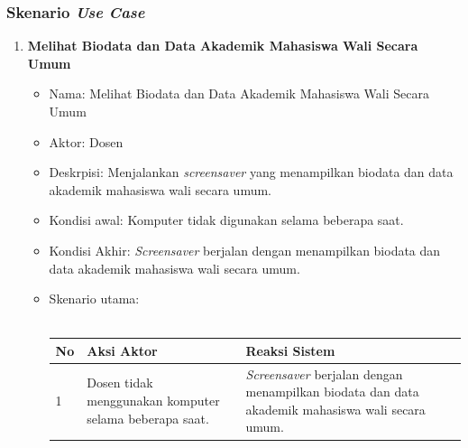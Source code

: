 \subsubsection{Skenario \textit{Use Case}}
\begin{enumerate}
	\item \textbf{Melihat Biodata dan Data Akademik Mahasiswa Wali Secara Umum}
	\begin{itemize}
		\item Nama: Melihat Biodata dan Data Akademik Mahasiswa Wali Secara Umum
		\item Aktor: Dosen 
		\item Deskrpisi: Menjalankan \textit{screensaver} yang menampilkan biodata dan data akademik mahasiswa wali secara umum.
		\item Kondisi awal: Komputer tidak digunakan selama beberapa saat.
		\item Kondisi Akhir: \textit{Screensaver} berjalan dengan menampilkan biodata dan data akademik mahasiswa wali secara umum.
		\item Skenario utama: \\ \\
			\begin{tabular}{|p{0.5cm} |p{6cm}| p{6cm}|}
				\hline
				No 	& Aksi Aktor & Reaksi Sistem \\ \hline
				1 	& Dosen tidak menggunakan komputer selama beberapa saat. 	&	\textit{Screensaver} berjalan dengan menampilkan biodata dan data akademik mahasiswa wali secara umum. \\ \hline 
			\end{tabular}
	\end{itemize}


\end{enumerate}
